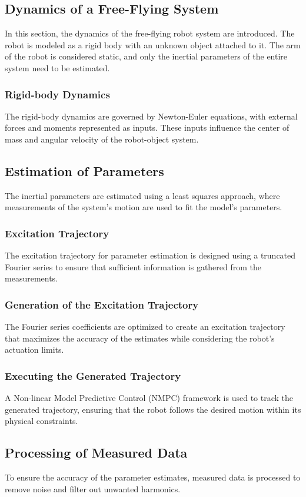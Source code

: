 \documentclass[a4paper,12pt]{article}
\begin{document}
    \subsection{Dynamics of a Free-Flying System}
    In this section, the dynamics of the free-flying robot system are introduced. The robot is modeled as a rigid body with an unknown object attached to it. The arm of the robot is considered static, and only the inertial parameters of the entire system need to be estimated.
    \subsubsection{Rigid-body Dynamics}
    The rigid-body dynamics are governed by Newton-Euler equations, with external forces and moments represented as inputs. These inputs influence the center of mass and angular velocity of the robot-object system.

    \subsection{Estimation of Parameters}
    The inertial parameters are estimated using a least squares approach, where measurements of the system's motion are used to fit the model's parameters.
    \subsubsection{Excitation Trajectory}
    The excitation trajectory for parameter estimation is designed using a truncated Fourier series to ensure that sufficient information is gathered from the measurements.
    \subsubsection{Generation of the Excitation Trajectory}
    The Fourier series coefficients are optimized to create an excitation trajectory that maximizes the accuracy of the estimates while considering the robot's actuation limits.
    \subsubsection{Executing the Generated Trajectory}
    A Non-linear Model Predictive Control (NMPC) framework is used to track the generated trajectory, ensuring that the robot follows the desired motion within its physical constraints.

    \subsection{Processing of Measured Data}
    To ensure the accuracy of the parameter estimates, measured data is processed to remove noise and filter out unwanted harmonics.
\end{document}
